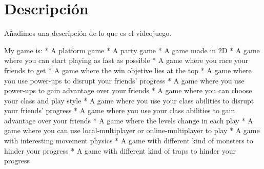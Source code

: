 \chapter{Descripción}
Añadimos una descripción de lo que es el videojuego.


My game is:
* A platform game
* A party game
* A game made in 2D
* A game where you can start playing as fast as possible
* A game where you race your friends to get
* A game where the win objetive lies at the top
* A game where you use power-ups to disrupt your friends' progress
* A game where you use power-ups to gain advantage over your friends
* A game where you can choose your class and play style
* A game where you use your class abilities to disrupt your friends' progress
* A game where you use your class abilities to gain advantage over your friends
* A game where the levels change in each play
* A game where you can use local-multiplayer or online-multiplayer to play
* A game with interesting movement physics
* A game with different kind of monsters to hinder your progress
* A game with different kind of traps to hinder your progress